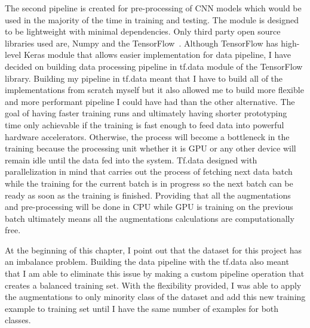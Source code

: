The second pipeline is created for pre-processing of CNN models which would be used in the majority of the time in training and testing.
The module is designed to be lightweight with minimal dependencies. Only third party open source libraries used are, Numpy and the TensorFlow~\cite{tensorflow}.
Although TensorFlow has high-level Keras module that allows easier implementation for data pipeline, I have decided on building data processing pipeline in tf.data module of the TensorFlow library.
Building my pipeline in tf.data meant that I have to build all of the implementations from scratch myself but it also allowed me to build more flexible and more performant pipeline I could have had than the other alternative. 
The goal of having faster training runs and ultimately having shorter prototyping time only achievable if the training is fast enough to feed data into powerful hardware accelerators.
Otherwise, the process will become a bottleneck in the training because the processing unit whether it is GPU or any other device will remain idle until the data fed into the system.
Tf.data designed with parallelization in mind that carries out the process of fetching next data batch while the training for the current batch is in progress so the next batch can be ready as soon as the training is finished.
Providing that all the augmentations and pre-processing will be done in CPU while GPU is training on the previous batch ultimately means all the augmentations calculations are computationally free.


At the beginning of this chapter, I point out that the dataset for this project has an imbalance problem.
Building the data pipeline with the tf.data also meant that I am able to eliminate this issue by making a custom pipeline operation that creates a balanced training set.
With the flexibility provided, I was able to apply the augmentations to only minority class of the dataset and add this new training example to training set until I have the same number of examples for both classes.




\clearpage